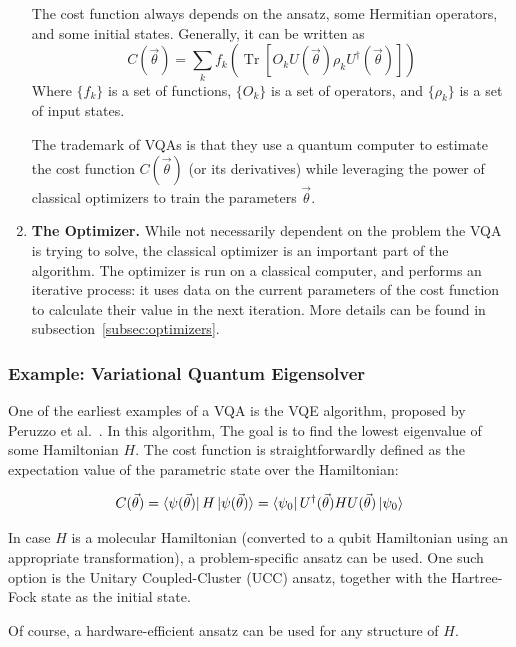 \documentclass[a4paper,12pt]{article}
\newcommand{\thetas}{\vec{\theta}}
\DeclareMathOperator{\tr}{Tr}
\begin{document}
\begin{enumerate}
    The cost function always depends on the ansatz, some Hermitian operators, and some initial states.
    Generally, it can be written as
    \begin{equation} \label{eqn:general_cost}
        C(\thetas) = \sum_k f_k(\tr[O_k U(\thetas) \rho_k U^\dagger(\thetas)])
    \end{equation} 
    Where $\{f_k\}$ is a set of functions, $\{O_k\}$ is a set of operators, and $\{\rho_k\}$ is a set of input states.
    
    The trademark of VQAs is that they use a quantum computer to estimate the cost function $C(\thetas)$ (or its derivatives) while leveraging the power of classical optimizers to train the parameters $\thetas$.
    
    \item \textbf{The Optimizer.} While not necessarily dependent on the problem the VQA is trying to solve, the classical optimizer is an important part of the algorithm.
    The optimizer is run on a classical computer, and performs an iterative process: it uses data on the current parameters of the cost function to calculate their value in the next iteration. More details can be found in subsection~\ref{subsec:optimizers}.
\end{enumerate}


\subsubsection{Example: Variational Quantum Eigensolver} \label{subsec:vqe}
One of the earliest examples of a VQA is the VQE algorithm, proposed by Peruzzo et al.~\cite{peruzzo_variational_2014}. In this algorithm, The goal is to find the lowest eigenvalue of some Hamiltonian $H$.
The cost function is straightforwardly defined as the expectation value of the parametric state over the Hamiltonian:

\begin{equation} \label{eqn:vqe_cost}
    C(\thetas) = \bra{\psi(\thetas)} H \ket{\psi(\thetas)} = \bra{\psi_0} U^\dagger(\thetas) H U(\thetas) \ket{\psi_0}
\end{equation}

In case $H$ is a molecular Hamiltonian (converted to a qubit Hamiltonian using an appropriate transformation), a problem-specific ansatz can be used. One such option is the Unitary Coupled-Cluster (UCC) ansatz, together with the Hartree-Fock state as the initial state.

Of course, a hardware-efficient ansatz can be used for any structure of $H$.
\end{document}
